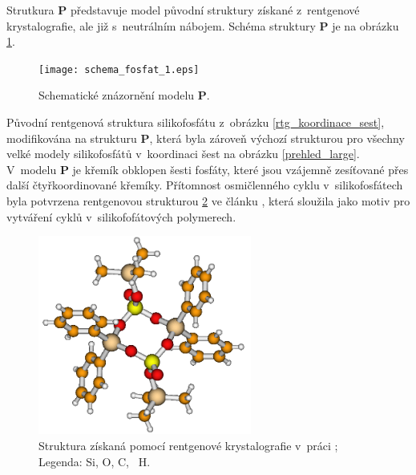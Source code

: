 \documentclass[
digital, %
table,   %
nolof,     %
nolot,     %
oneside,
]{fithesis3}
\begin{document}
Strutkura \textbf{P} představuje model původní struktury získané z~rentgenové krystalografie, ale již s~neutrálním nábojem. Schéma struktury \textbf{P} je na obrázku \ref{schema_fosfat}.
\begin{figure}\begin{center}\texttt{[image: schema\_fosfat\_1.eps]}
\caption{Schematické znázornění modelu \textbf{P}.}\label{schema_fosfat}
\end{center}\end{figure}
Původní rentgenová struktura silikofosfátu z~obrázku \ref{rtg_koordinace_sest}, modifikována na strukturu \textbf{P}, která byla zároveň výchozí strukturou pro všechny velké modely silikofosfátů v~koordinaci šest na obrázku  \ref{prehled_large}. V~modelu \textbf{P} je křemík obklopen šesti fosfáty, které jsou vzájemně zesíťované přes další čtyřkoordinované křemíky. Přítomnost osmičlenného cyklu v~silikofosfátech byla potvrzena rentgenovou strukturou \ref{rtg_4} ve článku \cite{rtg_4_pinkas}, která sloužila jako motiv pro vytváření cyklů v~silikofofátových polymerech.
\begin{figure}
\begin{center}
\includegraphics[width=7cm]{rtg_4_kruh_samotne.png}
\caption{Struktura \ce{[(Ph2Si{O2P(O)OSiMe3})2]} získaná pomocí rentgenové krystalografie v~práci \cite{rtg_4_pinkas};  Legenda:  Si,  O,  C, ~H.}
\label{rtg_4}
\end{center}
\end{figure}
\end{document}
